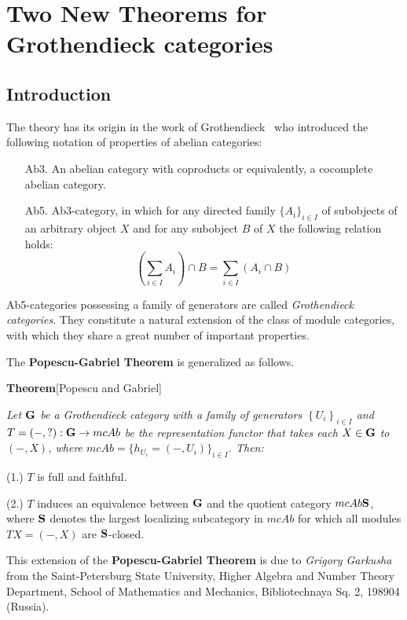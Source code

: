 \documentclass[12pt]{article}
\theoremstyle{plain}
\theoremstyle{definition}
\numberwithin{equation}{section}
\begin{document}
\section{Two New Theorems for Grothendieck categories}

\subsection{Introduction}

The theory has its origin in the work of Grothendieck~\cite{Gro} who
introduced the following notation of properties of abelian
categories:

\begin{itemize}
\item[Ab3.] An abelian category with coproducts or equivalently, a
            cocomplete abelian category.
\item[Ab5.] Ab3-category, in which for any directed family
            $\{A_i\}_{i\in I}$ of subobjects of an arbitrary object
            $X$ and for any subobject $B$ of $X$ the following relation holds:
            $$(\sum_{i\in I}A_i)\cap B=\sum_{i\in I}(A_i\cap B)$$
\end{itemize}

Ab5-categories possessing a family of generators are called {\em
Grothendieck categories}. They constitute a natural extension of the
class of module categories, with which they share a great number of
important properties.

The {\bf Popescu-Gabriel Theorem} is generalized as follows.

{\bf Theorem}[Popescu and Gabriel]
{\em Let ${\bf G}$ be a Grothendieck category with a family of generators
$\left\{U_i\right\}_{i \in I}$ and $T=(-,?): {\bf G} \to mcAb$ be the representation functor that takes each $X \in {\bf G}$ to $(-,X)$, where
$mcAb =\{h_{U_i}=(-,U_i)\}_{i\in I}$. 
Then:

(1.) $T$ is full and faithful.

(2.) $T$ induces an equivalence between ${\bf G}$ and the quotient category
$mcAb  {\bf S}$, where ${\bf S}$ denotes the largest localizing subcategory
in $mcAb$ for which all modules $TX=(-,X)$ are ${\bf S}$-closed.}

This extension of the {\bf Popescu-Gabriel Theorem} is due to {\em Grigory Garkusha} from the Saint-Petersburg State University, Higher Algebra and Number Theory Department, School of Mathematics and Mechanics, Bibliotechnaya Sq. 2, 198904 (Russia).
\end{document}
